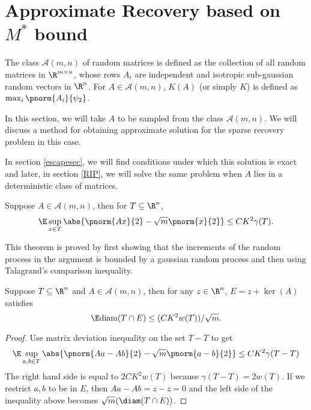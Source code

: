 \section{Approximate Recovery based on $M^*$ bound}
\begin{definition}
	The class $\mathcal{A}(m, n)$ of random matrices is defined
	as the collection of all random matrices in $\R^{m\times n}$,
	whose rows $A_i$ are independent and isotropic
	sub-gaussian random vectors in $\R^n$. For $A\in\mathcal{A}(m,n)$,
	$K(A)$ (or simply $K$) is defined as $\max_i \pnorm{A_i}{\psi_2}$.
\end{definition}
In this section, we will take $A$ to be sampled from the
class $\mathcal{A}(m, n)$. We will discuss a method for obtaining
approximate solution for the sparse recovery problem in this case.

In section \ref{escapesec}, we will find conditions under which
this solution is exact and
later,
in section \ref{RIP}, we will solve the same problem when $A$ lies in
a deterministic class of matrices.
\begin{theorem}
	Suppose $A\in\mathcal{A}(m, n)$, then for $T\subseteq \R^n$,
	\begin{equation}\label{matrixdeviation}
		\E \sup_{x\in T} \abs{\pnorm{Ax}{2}-\sqrt{m}\pnorm{x}{2}}
			\leq CK^2\gamma(T).
	\end{equation}
\end{theorem}
This theorem is proved by first showing that the increments of
the random process in the argument is bounded by a gaussian
random process and then using Talagrand's comparison inequality\cite{hdp}.
\begin{theorem}[$M^*$ bound]\label{mstarboundtheorem}
	Suppose $T\subseteq \R^n$ and $A\in\mathcal{A}(m, n)$,
	then for any $z\in\R^n$, $E = z+\ker(A)$ satisfies
	\begin{equation}\label{mstarbound}
		\E \text{diam}(T\cap E)\leq ({CK^2w(T)})/{\sqrt{m}}.
	\end{equation}
\end{theorem}
\begin{proof}
	Use matrix deviation inequality on the set $T-T$ to get
	$$\E\sup_{a,b\in T}\abs{\pnorm{Aa-Ab}{2}-\sqrt{m}\pnorm{a-b}{2}}\leq CK^2\gamma(T-T)$$
	The right hand side is equal to $2CK^2 w(T)$ because $\gamma(T-T) = 2w(T)$.
	If we restrict $a, b$ to be in $E$, then $Aa-Ab = z-z= 0$ and the left side of the 
	inequality above becomes $\sqrt{m}(\diam({T\cap E}))$.
\end{proof}

